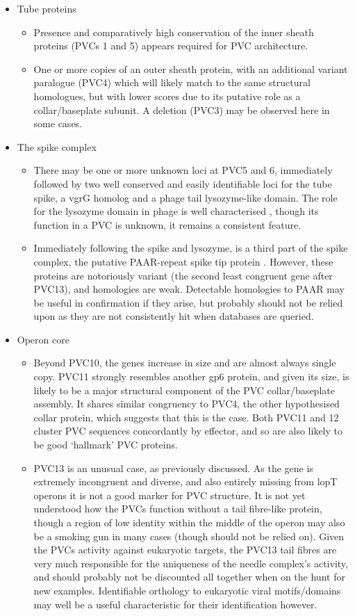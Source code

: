 \begin{itemize}
	\item{Tube proteins}
	\begin{itemize}
		\item Presence and comparatively high conservation of the inner sheath proteins (PVCs 1 and 5) appears required for PVC architecture.
		\item One or more copies of an outer sheath protein, with an additional variant paralogue (PVC4) which will likely match to the same structural homologues, but with lower scores due to its putative role as a collar/baseplate subunit. A deletion (PVC3) may be observed here in some cases.
	\end{itemize}
	\item{The spike complex}
	\begin{itemize}
		\item There may be one or more unknown loci at PVC5 and 6, immediately followed by two well conserved and easily identifiable loci for the tube spike, a vgrG homolog and a phage tail lysozyme-like domain. The role for the lysozyme domain in phage is well characterised \citep{Arisaka2003}, though its function in a PVC is unknown, it remains a consistent feature.
		\item Immediately following the spike and lysozyme, is a third part of the spike complex, the putative PAAR-repeat spike tip protein \citep{Shneider2013}. However, these proteins are notoriously variant (the second least congruent gene after PVC13), and homologies are weak. Detectable homologies to PAAR may be useful in confirmation if they arise, but probably should not be relied upon as they are not consistently hit when databases are queried.
	\end{itemize}
\item{Operon core}
	\begin{itemize}
	\item Beyond PVC10, the genes increase in size and are almost always single copy. PVC11 strongly resembles another gp6 protein, and given its size, is likely to be a major structural component of the PVC collar/baseplate assembly. It shares similar congruency to PVC4, the other hypothesised collar protein, which suggests that this is the case. Both PVC11 and 12 cluster PVC sequences concordantly by effector, and so are also likely to be good `hallmark' PVC proteins.
	\item PVC13 is an unusual case, as previously discussed. As the gene is extremely incongruent and diverse, and also entirely missing from lopT operons it is not a good marker for PVC structure. It is not yet understood how the PVCs function without a tail fibre-like protein, though a region of low identity within the middle of the operon may also be a smoking gun in many cases (though should not be relied on). Given the PVCs activity against eukaryotic targets, the PVC13 tail fibres are very much responsible for the uniqueness of the needle complex's activity, and should probably not be discounted all together when on the hunt for new examples. Identifiable orthology to eukaryotic viral motifs/domains may well be a useful characteristic for their identification however.

\end{itemize}
\end{itemize}
